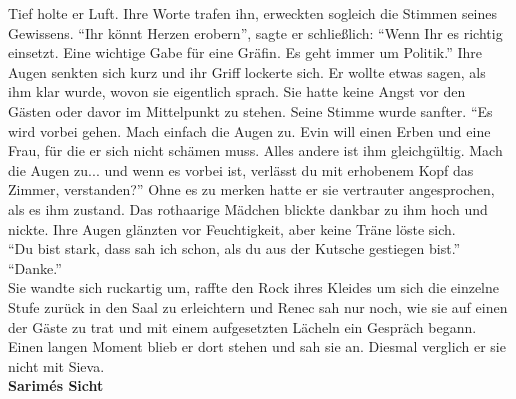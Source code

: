 Tief holte er Luft. Ihre Worte trafen ihn, erweckten sogleich die Stimmen seines Gewissens. ``Ihr 
könnt Herzen erobern'', sagte er schließlich: ``Wenn Ihr es richtig einsetzt. Eine wichtige Gabe für 
eine Gräfin. Es geht immer um Politik.''
Ihre Augen senkten sich kurz und ihr Griff lockerte sich. Er wollte etwas sagen, als ihm klar 
wurde, wovon sie eigentlich sprach. Sie hatte keine Angst vor den Gästen oder davor im Mittelpunkt 
zu stehen. Seine Stimme wurde sanfter. ``Es wird vorbei gehen. Mach einfach die Augen zu. Evin will 
einen Erben und eine Frau, für die er sich nicht schämen muss. Alles andere ist ihm gleichgültig. 
Mach die Augen zu... und wenn es vorbei ist, verlässt du mit erhobenem Kopf das Zimmer, 
verstanden?'' Ohne es zu merken hatte er sie vertrauter angesprochen, als es ihm zustand. Das 
rothaarige Mädchen blickte dankbar zu ihm hoch und nickte. Ihre Augen glänzten vor Feuchtigkeit, 
aber keine Träne löste sich.\\
``Du bist stark, dass sah ich schon, als du aus der Kutsche gestiegen bist.''\\
``Danke.''\\
Sie wandte sich ruckartig um, raffte den Rock ihres Kleides um sich die einzelne Stufe zurück in 
den Saal zu erleichtern und Renec sah nur noch, wie sie auf einen der Gäste zu trat und mit einem 
aufgesetzten Lächeln ein Gespräch begann. Einen langen Moment blieb er dort stehen und sah sie an. 
Diesmal verglich er sie nicht mit Sieva. \\


\textbf{Sarimés Sicht}

